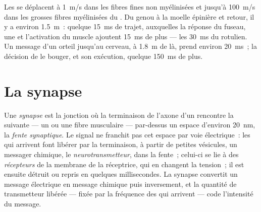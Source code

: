 \begin{example}[La vitesse]\label{ex:g12:stretch-reflex:speed}
Les  se déplacent à \qty{1}{m/s} dans les fibres
fines non myélinisées et jusqu'à \qty{100}{m/s} dans les grosses
fibres myélinisées du . Du genou à la moelle
épinière et retour, il y a environ \qty{1.5}{m}~: quelque \qty{15}{ms}
de trajet, auxquelles la réponse du fuseau, une  et l'activation
du muscle ajoutent \qty{15}{ms} de plus --- les \qty{30}{ms} du
 rotulien. Un message d'un orteil jusqu'au cerveau, à
\qty{1.8}{m} de là, prend environ \qty{20}{ms}~; la décision de le
bouger, et son exécution, quelque \qty{150}{ms} de plus.
\end{example}

\section{La synapse}

\begin{definition}\label{def:g12:stretch-reflex:synapse}
Une \emph{synapse} est la jonction où la terminaison de
l'axone d'un  rencontre la  suivante --- un  ou
une fibre musculaire --- par-dessus un espace d'environ \qty{20}{nm},
la \emph{fente synaptique}. Le signal ne franchit pas cet
espace par voie électrique~: les  qui arrivent font
libérer par la terminaison, à partir de petites vésicules, un messager
chimique, le \emph{neurotransmetteur}, dans
la fente~; celui-ci se lie à des \emph{récepteurs} de la membrane de
la  réceptrice, qui en changent la tension~; il est ensuite
détruit ou repris en quelques millisecondes. La synapse convertit un
message électrique en message chimique puis inversement, et la
quantité de transmetteur libérée --- fixée par la fréquence des
 qui arrivent --- code l'intensité du message.
\end{definition}

